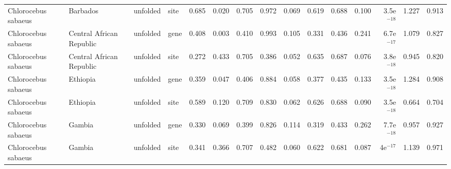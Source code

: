 \begin{longtable}{llllrrrrrrrrrrr}
 Chlorocebus sabaeus &                  Barbados &  unfolded &  site &                              0.685 &                               0.020 &                 0.705 &                 0.972 &                              0.069 &                               0.619 &                 0.688 &                 0.100 & 3.5e$^{-18}$ &  1.227 &  0.913 \\
 Chlorocebus sabaeus &  Central African Republic &  unfolded &  gene &                              0.408 &                               0.003 &                 0.410 &                 0.993 &                              0.105 &                               0.331 &                 0.436 &                 0.241 & 6.7e$^{-17}$ &  1.079 &  0.827 \\
 Chlorocebus sabaeus &  Central African Republic &  unfolded &  site &                              0.272 &                               0.433 &                 0.705 &                 0.386 &                              0.052 &                               0.635 &                 0.687 &                 0.076 & 3.8e$^{-18}$ &  0.945 &  0.820 \\
 Chlorocebus sabaeus &                  Ethiopia &  unfolded &  gene &                              0.359 &                               0.047 &                 0.406 &                 0.884 &                              0.058 &                               0.377 &                 0.435 &                 0.133 & 3.5e$^{-18}$ &  1.284 &  0.908 \\
 Chlorocebus sabaeus &                  Ethiopia &  unfolded &  site &                              0.589 &                               0.120 &                 0.709 &                 0.830 &                              0.062 &                               0.626 &                 0.688 &                 0.090 & 3.5e$^{-18}$ &  0.664 &  0.704 \\
 Chlorocebus sabaeus &                    Gambia &  unfolded &  gene &                              0.330 &                               0.069 &                 0.399 &                 0.826 &                              0.114 &                               0.319 &                 0.433 &                 0.262 & 7.7e$^{-18}$ &  0.957 &  0.927 \\
 Chlorocebus sabaeus &                    Gambia &  unfolded &  site &                              0.341 &                               0.366 &                 0.707 &                 0.482 &                              0.060 &                               0.622 &                 0.681 &                 0.087 &   4e$^{-17}$ &  1.139 &  0.971 \\

\end{longtable}

